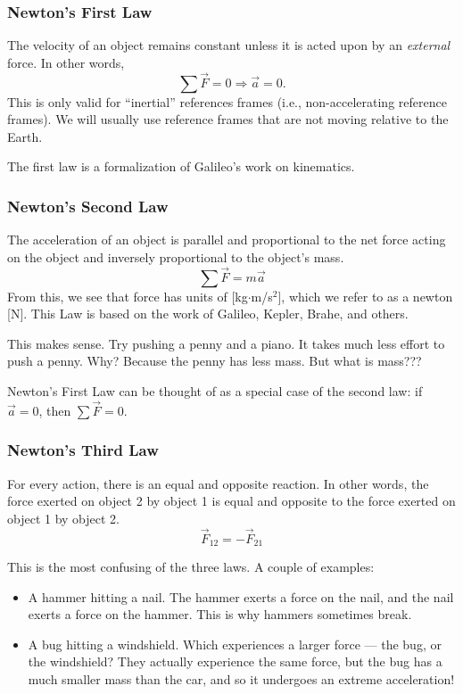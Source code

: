 \subsubsection{Newton's First Law}
The velocity of an object remains constant unless it is acted upon by an \textit{external} force. In other words,
$$\sum\vec{F}=0\Rightarrow \vec{a}=0.$$
This is only valid for ``inertial'' references frames (i.e., non-accelerating reference frames). We will usually use reference frames that are not moving relative to the Earth. 

The first law is a formalization of Galileo's work on kinematics.

\subsubsection{Newton's Second Law}
The acceleration of an object is parallel and proportional to the net force acting on the object and inversely proportional to the object's mass.
$$\sum\vec{F}=m\vec{a}$$
From this, we see that force has units of [kg$\cdot$m/s$^2$], which we refer to as a newton [N]. This Law is based on the work of Galileo, Kepler, Brahe, and others.

This makes sense. Try pushing a penny and a piano. It takes much less effort to push a penny. Why? Because the penny has less mass. But what is mass???

Newton's First Law can be thought of as a special case of the second law: if $\vec{a}=0$, then $\sum \vec{F}=0$.

\subsubsection{Newton's Third Law}
For every action, there is an equal and opposite reaction. In other words, the force exerted on object 2 by object 1 is equal and opposite to the force exerted on object 1 by object 2.
$$\vec{F}_{12}=-\vec{F}_{21}$$

This is the most confusing of the three laws. A couple of examples:
\begin{itemize}
\item A hammer hitting a nail. The hammer exerts a force on the nail, and the nail exerts a force on the hammer. This is why hammers sometimes break.
\item A bug hitting a windshield. Which experiences a larger force --- the bug, or the windshield? They actually experience the same force, but the bug has a much smaller mass than the car, and so it undergoes an extreme acceleration!
\end{itemize}

